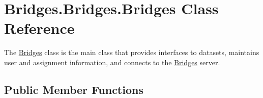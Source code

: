 \hypertarget{class_bridges_1_1_bridges_1_1_bridges}{}\section{Bridges.\+Bridges.\+Bridges Class Reference}
\label{class_bridges_1_1_bridges_1_1_bridges}


The \mbox{\hyperlink{class_bridges_1_1_bridges_1_1_bridges}{Bridges}} class is the main class that provides interfaces to datasets, maintains user and assignment information, and connects to the \mbox{\hyperlink{class_bridges_1_1_bridges_1_1_bridges}{Bridges}} server.  


\subsection*{Public Member Functions}
